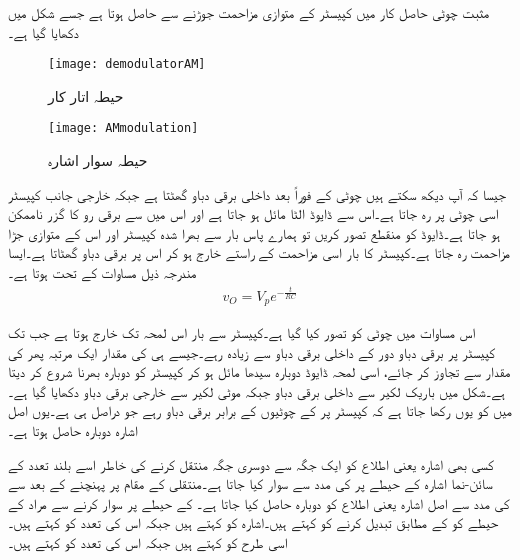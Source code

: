 مثبت چوٹی حاصل کار میں کپیسٹر کے متوازی مزاحمت جوڑنے سے   حاصل ہوتا ہے جسے شکل   میں دکھایا گیا ہے۔
\begin{figure}
\centering
\texttt{[image: demodulatorAM]}
\caption{حیطہ اتار کار}
\label{شکل_حیطہ_اتر_کار}
\end{figure}
%
\begin{figure}
\centering
\texttt{[image: AMmodulation]}
\caption{حیطہ سوار اشارہ}
\label{شکل_حیطہ_سوار_اشارہ}
\end{figure}
جیسا کہ آپ دیکھ سکتے ہیں چوٹی  کے  فوراً بعد داخلی برقی دباو گھٹتا ہے جبکہ خارجی جانب کپیسٹر اسی چوٹی پر رہ جاتا ہے۔اس سے ڈایوڈ الٹا مائل ہو جاتا ہے اور اس میں سے برقی رو کا گزر ناممکن ہو جاتا ہے۔ڈایوڈ کو منقطع تصور کریں تو ہمارے پاس بار سے بھرا شدہ کپیسٹر   اور اس کے متوازی جڑا مزاحمت  رہ جاتا ہے۔کپیسٹر کا بار اسی مزاحمت کے راستے  خارج ہو کر اس پر برقی دباو گھٹاتا ہے۔ایسا مندرجہ ذیل مساوات کے تحت ہوتا ہے۔
\begin{align} \label{مساوات_حیطہ_اتار_کار_الف}
v_O=V_{p} e^{-\frac{t}{RC}}
\end{align}

اس مساوات میں چوٹی کو  تصور کیا گیا ہے۔کپیسٹر سے بار اس لمحہ تک خارج ہوتا ہے جب تک کپیسٹر پر برقی دباو   دور کے داخلی برقی دباو   سے زیادہ رہے۔جیسے ہی کی مقدار ایک مرتبہ پھر کی مقدار سے تجاوز کر جائے، اسی لمحہ ڈایوڈ دوبارہ سیدھا مائل ہو کر کپیسٹر کو دوبارہ بھرنا شروع کر دیتا ہے۔شکل میں باریک لکیر سے داخلی برقی دباو جبکہ موٹی لکیر سے خارجی برقی دباو دکھایا گیا ہے۔ میں  کو یوں رکھا جاتا ہے کہ  کپیسٹر پر  کے چوٹیوں کے برابر برقی دباو رہے جو دراصل  ہی ہے۔یوں اصل اشارہ دوبارہ حاصل ہوتا ہے۔

کسی بھی اشارہ یعنی اطلاع   کو ایک جگہ سے دوسری جگہ منتقل کرنے کی خاطر اسے بلند تعدد کے سائن-نما اشارہ  کے حیطے پر  کی مدد سے سوار کیا جاتا ہے۔منتقلی کے مقام پر پہنچنے کے بعد  سے  کی مدد سے اصل اشارہ یعنی اطلاع  کو  دوبارہ حاصل کیا جاتا ہے۔ کے حیطے پر سوار کرنے سے مراد  کے حیطے کو  کے مطابق تبدیل کرنے کو کہتے ہیں۔اشارہ   کو  کہتے ہیں جبکہ اس کی تعدد کو  کہتے ہیں۔اسی طرح  کو  کہتے ہیں جبکہ اس کی تعدد کو  کہتے ہیں۔

